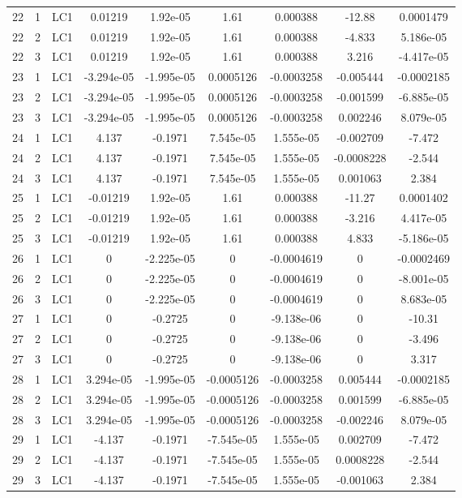 \documentclass{article}%
\begin{document}
\begin{longtable}{| c c c | c c c c c c |}
22&1&LC1&0.01219&1.92e{-}05&1.61&0.000388&{-}12.88&0.0001479\\%
22&2&LC1&0.01219&1.92e{-}05&1.61&0.000388&{-}4.833&5.186e{-}05\\%
22&3&LC1&0.01219&1.92e{-}05&1.61&0.000388&3.216&{-}4.417e{-}05\\%
23&1&LC1&{-}3.294e{-}05&{-}1.995e{-}05&0.0005126&{-}0.0003258&{-}0.005444&{-}0.0002185\\%
23&2&LC1&{-}3.294e{-}05&{-}1.995e{-}05&0.0005126&{-}0.0003258&{-}0.001599&{-}6.885e{-}05\\%
23&3&LC1&{-}3.294e{-}05&{-}1.995e{-}05&0.0005126&{-}0.0003258&0.002246&8.079e{-}05\\%
24&1&LC1&4.137&{-}0.1971&7.545e{-}05&1.555e{-}05&{-}0.002709&{-}7.472\\%
24&2&LC1&4.137&{-}0.1971&7.545e{-}05&1.555e{-}05&{-}0.0008228&{-}2.544\\%
24&3&LC1&4.137&{-}0.1971&7.545e{-}05&1.555e{-}05&0.001063&2.384\\%
25&1&LC1&{-}0.01219&1.92e{-}05&1.61&0.000388&{-}11.27&0.0001402\\%
25&2&LC1&{-}0.01219&1.92e{-}05&1.61&0.000388&{-}3.216&4.417e{-}05\\%
25&3&LC1&{-}0.01219&1.92e{-}05&1.61&0.000388&4.833&{-}5.186e{-}05\\%
26&1&LC1&0&{-}2.225e{-}05&0&{-}0.0004619&0&{-}0.0002469\\%
26&2&LC1&0&{-}2.225e{-}05&0&{-}0.0004619&0&{-}8.001e{-}05\\%
26&3&LC1&0&{-}2.225e{-}05&0&{-}0.0004619&0&8.683e{-}05\\%
27&1&LC1&0&{-}0.2725&0&{-}9.138e{-}06&0&{-}10.31\\%
27&2&LC1&0&{-}0.2725&0&{-}9.138e{-}06&0&{-}3.496\\%
27&3&LC1&0&{-}0.2725&0&{-}9.138e{-}06&0&3.317\\%
28&1&LC1&3.294e{-}05&{-}1.995e{-}05&{-}0.0005126&{-}0.0003258&0.005444&{-}0.0002185\\%
28&2&LC1&3.294e{-}05&{-}1.995e{-}05&{-}0.0005126&{-}0.0003258&0.001599&{-}6.885e{-}05\\%
28&3&LC1&3.294e{-}05&{-}1.995e{-}05&{-}0.0005126&{-}0.0003258&{-}0.002246&8.079e{-}05\\%
29&1&LC1&{-}4.137&{-}0.1971&{-}7.545e{-}05&1.555e{-}05&0.002709&{-}7.472\\%
29&2&LC1&{-}4.137&{-}0.1971&{-}7.545e{-}05&1.555e{-}05&0.0008228&{-}2.544\\%
29&3&LC1&{-}4.137&{-}0.1971&{-}7.545e{-}05&1.555e{-}05&{-}0.001063&2.384\\%

\end{longtable}
\end{document}
